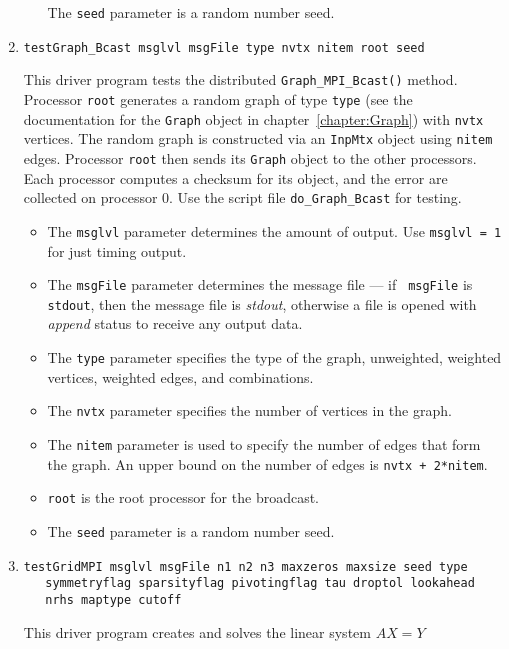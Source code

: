 \begin{enumerate}
\begin{itemize}
The {\tt seed} parameter is a random number seed.
\end{itemize}
\item
\begin{verbatim}
testGraph_Bcast msglvl msgFile type nvtx nitem root seed 
\end{verbatim}
This driver program tests the distributed 
{\tt Graph\_MPI\_Bcast()} method.
Processor {\tt root} generates a random graph of type {\tt type}
(see the documentation for the {\tt Graph} object in
chapter~\ref{chapter:Graph}) with {\tt nvtx} vertices.
The random graph is constructed via an {\tt InpMtx} object
using {\tt nitem} edges.
Processor {\tt root} then sends its {\tt Graph} object to the other
processors.
Each processor computes a checksum for its object, and the error
are collected on processor 0.
Use the script file {\tt do\_Graph\_Bcast} for testing.
\par
\begin{itemize}
\item
The {\tt msglvl} parameter determines the amount of output.
Use {\tt msglvl = 1} for just timing output.
\item
The {\tt msgFile} parameter determines the message file --- if {\tt
msgFile} is {\tt stdout}, then the message file is {\it stdout},
otherwise a file is opened with {\it append} status to receive any
output data.
\item
The {\tt type} parameter specifies the type of the graph,
unweighted, weighted vertices, weighted edges, and combinations.
\item
The {\tt nvtx} parameter specifies the number of vertices in the
graph.
\item
The {\tt nitem} parameter is used to specify the number of edges
that form the graph. An upper bound on the number of edges is
{\tt nvtx + 2*nitem}.
\item
{\tt root} is the root processor for the broadcast.
\item
The {\tt seed} parameter is a random number seed.
\end{itemize}
\item
\begin{verbatim}
testGridMPI msglvl msgFile n1 n2 n3 maxzeros maxsize seed type
   symmetryflag sparsityflag pivotingflag tau droptol lookahead 
   nrhs maptype cutoff
\end{verbatim}
This driver program creates and solves the linear system $AX = Y$

\end{enumerate}
